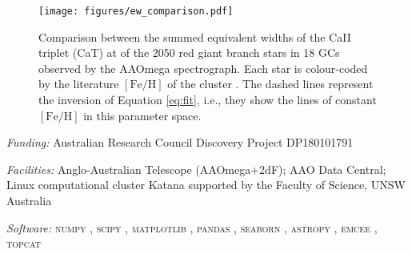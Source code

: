 \documentclass[RNAAS]{aastex63}
\newcommand{\feh}{\ensuremath{[\textrm{Fe}/\textrm{H}]}\xspace}
\begin{document}
\begin{figure}[h!]
\begin{center}
\texttt{[image: figures/ew\_comparison.pdf]}
\caption{Comparison between the summed equivalent widths of the CaII triplet (CaT) at of the 2050 red giant branch stars in 18 GCs observed by the AAOmega spectrograph. Each star is colour-coded by the literature \feh of the cluster \citep{Usher2019}. The dashed lines represent the inversion of Equation \ref{eq:fit}, i.e., they show the lines of constant \feh in this parameter space. \label{fig:the_figure}}
\end{center}
\end{figure}

\acknowledgments

{\it Funding:}
{Australian Research Council Discovery Project DP180101791}

{\it Facilities:} 
{Anglo-Australian Telescope (AAOmega+2dF); AAO Data Central; Linux computational cluster Katana supported by the Faculty of Science, UNSW Australia}

{\it Software:} 
{\textsc{numpy} \citep{numpy}, 
\textsc{scipy} \citep{SciPy1.0Contributors2020}, 
\textsc{matplotlib} \citep{matplotlib}, 
\textsc{pandas} \citep{pandas},
\textsc{seaborn} \citep{seaborn},
\textsc{astropy} \citep{TheAstropyCollaboration2018},
\textsc{emcee} \citep{Foreman-Mackey2013a},
\textsc{topcat} \citep{Taylor2005,Taylor2006}
}
\end{document}
